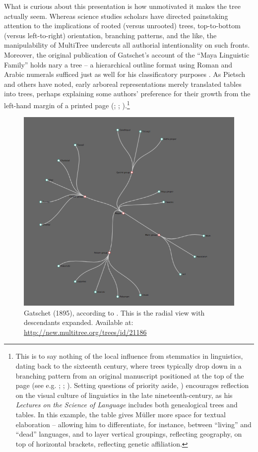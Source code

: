 \documentclass[output=paper]{langscibook}
\begin{document}
What is curious about this presentation is how unmotivated it makes the tree actually seem. Whereas science studies scholars have directed painstaking attention to the implications of rooted (versus unrooted) trees, top-to-bottom (versus left-to-right) orientation, branching patterns, and the like, the manipulability of MultiTree undercuts all authorial intentionality on such fronts. Moreover, the original publication of Gatschet's account of the ``Maya Linguistic Family'' holds nary a tree – a hierarchical outline format using Roman and Arabic numerals sufficed just as well for his classificatory purposes \citep[250-251]{GatschetCampbell1973}. As Pietsch and others have noted, early arboreal representations merely translated tables into trees, perhaps explaining some authors' preference for their growth from the left-hand margin of a printed page (\citealt[51]{Wells1987}; \citealt[7-10]{Pietsch2012}; \citealt[57]{Archibald2014}).\footnote{This is to say nothing of the local influence from stemmatics in linguistics, dating back to the sixteenth century, where trees typically drop down in a branching pattern from an original manuscript positioned at the top of the page (see e.g. \citealt{Maher1966}; \citealt{Hoenigswald1975}; \citealt{Cameron1987}). Setting questions of priority aside, \citet[vol. I, 537]{Mueller19131891}) encourages reflection on the visual culture of linguistics in the late nineteenth-century, as his \emph{Lectures on the Science of Language} includes both genealogical trees and tables. In this example, the table gives Müller more space for textual elaboration – allowing him to differentiate, for instance, between ``living'' and ``dead'' languages, and to layer vertical groupings, reflecting geography, on top of horizontal brackets, reflecting genetic affiliation.}

\begin{figure}
    \centering
    \includegraphics[scale=0.8]{figures/gatschet1895.png}
    \caption{Gatschet (1895), according to \citet{GatschetCampbell1973}. This is the radial view with descendants expanded. Available at: \url{http://new.multitree.org/trees/id/21186}}
    \label{fig:kaplan:gatschet}
\end{figure}
\end{document}
